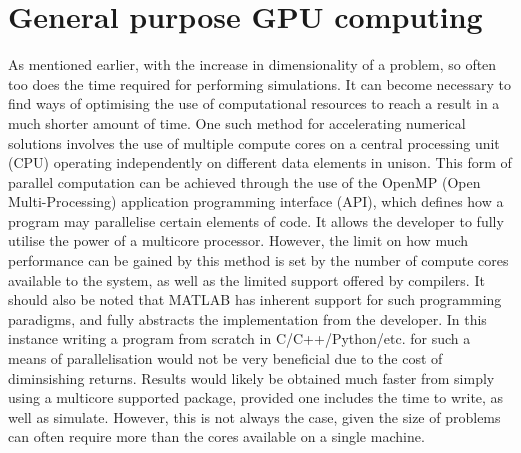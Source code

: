 \section{General purpose GPU computing}

As mentioned earlier, with the increase in dimensionality of a problem, so often too does the time required for performing simulations. It can become necessary to find ways of optimising the use of computational resources to reach a result in a much shorter amount of time. One such method for accelerating numerical solutions involves the use of multiple compute cores on a central processing unit (CPU) operating independently on different data elements in unison. This form of parallel computation can be achieved through the use of the OpenMP (Open Multi-Processing) application programming interface (API), which defines how a program may parallelise certain elements of code. It allows the developer to fully utilise the power of a multicore processor. However, the limit on how much performance can be gained by this method is set by the number of compute cores available to the system, as well as the limited support offered by compilers. It should also be noted that MATLAB has inherent support for such programming paradigms, and fully abstracts the implementation from the developer. In this instance writing a program from scratch in C/C++/Python/etc. for such a means of parallelisation would not be very beneficial due to the cost of diminsishing returns. Results would likely be obtained much faster from simply using a multicore supported package, provided one includes the time to write, as well as simulate. However, this is not always the case, given the size of problems can often require more than the cores available on a single machine.

